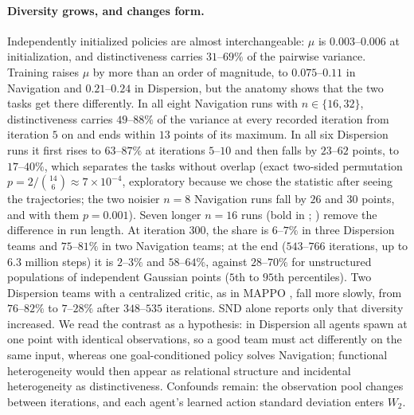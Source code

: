 \documentclass[twoside,11pt]{article}
\begin{document}
\paragraph{Diversity grows, and changes form.}
Independently initialized policies are almost interchangeable: $\mu$ is
$0.003$--$0.006$ at initialization, and distinctiveness carries $31$--$69\%$
of the pairwise variance. Training raises $\mu$ by more than an order of
magnitude, to $0.075$--$0.11$ in Navigation and $0.21$--$0.24$ in Dispersion,
but the anatomy shows that the two tasks get there differently. In all eight
Navigation runs with $n\in\{16,32\}$, distinctiveness carries $49$--$88\%$ of
the variance at every recorded iteration from iteration $5$ on and ends within
$13$ points of its maximum. In all six Dispersion runs it first rises to
$63$--$87\%$ at iterations $5$--$10$ and then falls by $23$--$62$ points, to
$17$--$40\%$, which separates the tasks without overlap (exact two-sided
permutation $p=2/\binom{14}{6}\approx7\times10^{-4}$, exploratory because we
chose the statistic after seeing the trajectories; the two noisier $n=8$
Navigation runs fall by $26$ and $30$ points, and with them $p=0.001$). Seven
longer $n=16$ runs (bold in ; )
remove the difference in run length. At iteration $300$, the share is
$6$--$7\%$ in three Dispersion teams and $75$--$81\%$ in two Navigation teams;
at the end ($543$--$766$ iterations, up to $6.3$ million steps) it is $2$--$3\%$
and $58$--$64\%$, against $28$--$70\%$ for unstructured populations of
independent Gaussian points ($5$th to $95$th percentiles). Two Dispersion
teams with a centralized critic, as in MAPPO \citep{yu2022surprising}, fall
more slowly, from $76$--$82\%$ to $7$--$28\%$ after $348$--$535$ iterations.
SND alone reports only that diversity increased. We read the contrast
as a hypothesis: in Dispersion all agents spawn at one point with identical
observations, so a good team must act differently on the same input, whereas
one goal-conditioned policy solves Navigation; functional heterogeneity would
then appear as relational structure and incidental heterogeneity as
distinctiveness. Confounds remain: the observation pool changes between
iterations, and each agent's learned action standard deviation enters $W_2$.
\end{document}

